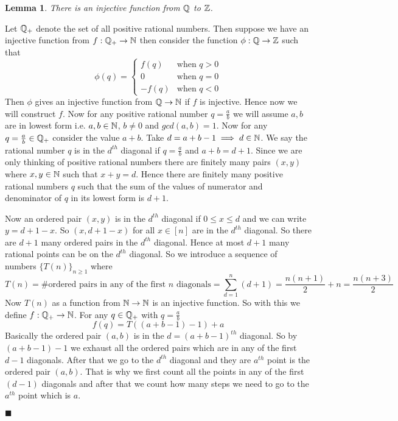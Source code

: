 \documentclass[a4paper, 11pt]{article}
\newtheorem{lemma}{Lemma}
\renewenvironment{proof}{\noindent{\it \textbf{Proof:}}\hspace*{1em}}{\hfill $\blacksquare$\bigskip\\}
\begin{document}
{\begin{itemize}
\begin{lemma}\label{qtozinj}
	There is an injective function from $\mathbb{Q}$ to $\mathbb{Z}$. 
\end{lemma}
\begin{proof}
	Let $\mathbb{Q}_+$ denote the set of all positive rational numbers. Then suppose we have an injective function from $f:\mathbb{Q}_+\to\mathbb{N}$ then consider the function $\phi:\mathbb{Q}\to \mathbb{Z}$ such that $$\phi(q)=\begin{cases}
		f(q) & \text{when $q>0$}\\
		0 & \text{when $q=0$}\\
		-f(q) & \text{when $q<0$}
	\end{cases}$$Then $\phi$ gives an injective function from $\mathbb{Q}\to \mathbb{N}$ if $f$ is injective. Hence now we will construct $f$. Now for any positive rational number $q=\frac{a}{b}$ we will assume $a,b$ are in lowest form i.e. $a,b\in\mathbb{N}$, $b\neq 0$ and $gcd(a,b)=1$. Now for any $q=\frac{a}{b}\in\mathbb{Q}_+$ consider the value $a+b$. Take $d=a+b-1\implies d\in\mathbb{N}$. We say the rational number $q$ is in the $d^{th}$ diagonal if $q=\frac{a}{b}$ and $a+b=d+1$. Since we are only thinking of positive rational numbers there are finitely many pairs $(x,y)$ where $x,y\in\mathbb{N}$ such that $x+y=d$. Hence there are finitely many positive rational numbers $q$ such that the sum of the values of numerator and denominator of $q$ in its lowest form is $d+1$. 

Now an ordered pair $(x,y)$ is in the $d^{th}$ diagonal if $0\leq x\leq d$ and we can write $y=d+1-x$. So $(x,d+1-x)$ for all $x\in[n]$ are in the $d^{th}$ diagonal. So there are $d+1$ many ordered pairs in the $d^{th}$ diagonal. Hence at most $d+1$ many rational points can be on the $d^{th}$ diagonal. So we introduce a sequence of numbers $\{T(n)\}_{n\geq 1}$ where $$T(n)=\#\text{ordered pairs in any of the first $n$ diagonals}=\sum_{d=1}^n(d+1)=\frac{n(n+1)}2+n=\frac{n(n+3)}2$$Now $T(n)$ as a function from $\mathbb{N}\to \mathbb{N}$ is an injective function. So with this we define $f:\mathbb{Q}_+\to\mathbb{N}$. For any $q\in\mathbb{Q}_+$ with $q=\frac{a}{b}$ $$f(q)=T((a+b-1)-1)+a$$Basically the ordered pair $(a,b)$ is in the $d=(a+b-1)^{th}$ diagonal. So by $(a+b-1)-1$ we exhaust all the ordered pairs which are in any of the first $d-1$ diagonals. After that we go to the $d^{th}$ diagonal and they are $a^{th}$ point is the ordered pair $(a,b)$. That is why we first count all the points in any of the first $(d-1)$ diagonals and after that we count how many steps we need to go to the $a^{th}$ point which is $a$.


\end{proof}
\end{itemize}}
\end{document}
